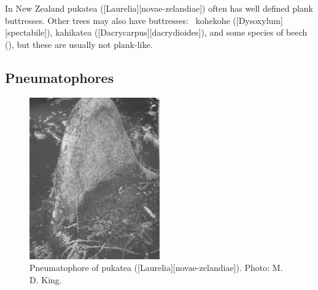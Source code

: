 In New Zealand pukatea ([Laurelia][novae-zelandiae]) often has well defined plank buttresses.
Other trees may also have buttresses: \eg\ kohekohe ([Dysoxylum][spectabile]), kahikatea ([Dacrycarpus][dacrydioides]), and some species of beech (), but these are usually not plank-like.

\subsection{Pneumatophores}

\begin{figure}
	\includegraphics[width=0.5\textwidth]{graphics/figure10pukatea.jpg}
	\centering
	\caption[Pneumatophore of pukatea]{Pneumatophore of pukatea ([Laurelia][novae-zelandiae]).
	Photo:  M. D. King.}%
	\label{fig:10pukatea}
\end{figure}

